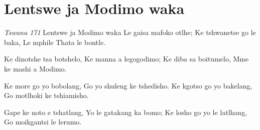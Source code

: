\starttocol
\chapter{Lentswe ja Modimo waka}
\nexttocol
\hfill{\it Tswana 171}
\stoptocol
\starttocol
\startlines
{\sc Lentswe} ja Modimo waka
Le gaisa mafoko otlhe;
Ke tshwanetse go le baka,
Le mphile Thata le bontle.

Ke dinotshe tsa botshelo,
Ke manna a legogodimo;
Ke diba sa boitumelo,
Mme ke mashi a Modimo.

Ke more go yo bobolang,
Go yo shuleng ke tshedisho.
Ke kgotso go yo bakelang,
Go motlhoki ke tshiamisho.

Gape ke noto e tshatlang,
Yo le gatakang ka bomo;
Ke losho go yo le latlhang,
Go moikgantsi le lerumo.
\stoplines
\nexttocol

\stoptocol
